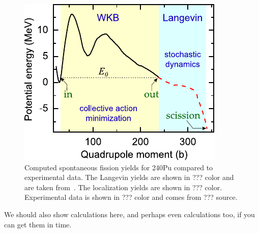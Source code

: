 \begin{figure}
	\centering
	\includegraphics[width=0.5\linewidth]{TeX_files/methods_overview}
	\caption[Computed spontaneous fission yields for 240Pu compared to experimental data. The Langevin yields are shown in ??? color and are taken from~\cite{Sadhukhan2016}. The localization yields are shown in ??? color. Experimental data is shown in ??? color and comes from ??? source.]{Computed spontaneous fission yields for 240Pu compared to experimental data. The Langevin yields are shown in ??? color and are taken from~\cite{Sadhukhan2016}. The localization yields are shown in ??? color. Experimental data is shown in ??? color and comes from ??? source.}
	\label{fig:methods240Puyield}
\end{figure}

We should also show {\Og} calculations here, and perhaps even {\Pt} calculations too, if you can get them in time.

